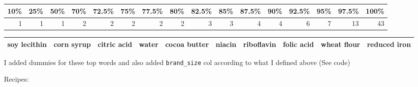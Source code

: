 \documentclass[
]{article}
\newenvironment{Shaded}{\begin{snugshade}}{\end{snugshade}}
\newcommand{\CommentTok}[1]{\textcolor[rgb]{0.56,0.35,0.01}{\textit{#1}}}
\newcommand{\DataTypeTok}[1]{\textcolor[rgb]{0.13,0.29,0.53}{#1}}
\newcommand{\DecValTok}[1]{\textcolor[rgb]{0.00,0.00,0.81}{#1}}
\newcommand{\KeywordTok}[1]{\textcolor[rgb]{0.13,0.29,0.53}{\textbf{#1}}}
\newcommand{\NormalTok}[1]{#1}
\newcommand{\OperatorTok}[1]{\textcolor[rgb]{0.81,0.36,0.00}{\textbf{#1}}}
\newcommand{\OtherTok}[1]{\textcolor[rgb]{0.56,0.35,0.01}{#1}}
\newcommand{\StringTok}[1]{\textcolor[rgb]{0.31,0.60,0.02}{#1}}
\begin{document}
\begin{tabular}{r|r|r|r|r|r|r|r|r|r|r|r|r|r|r|r}
\hline
10\% & 25\% & 50\% & 70\% & 72.5\% & 75\% & 77.5\% & 80\% & 82.5\% & 85\% & 87.5\% & 90\% & 92.5\% & 95\% & 97.5\% & 100\%\\
\hline
1 & 1 & 1 & 2 & 2 & 2 & 2 & 2 & 3 & 3 & 4 & 4 & 6 & 7 & 13 & 43\\
\hline
\end{tabular}

\begin{Shaded}
\end{Shaded}

\begin{tabular}{l|l|l|l|l|l|l|l|l|l}
\hline
soy lecithin & corn syrup & citric acid & water & cocoa butter & niacin & riboflavin & folic acid & wheat flour & reduced iron\\
\hline
\end{tabular}

I added dummies for these top words and also added \texttt{brand\_size}
col according to what I defined above (See code)

Recipes:
\end{document}
